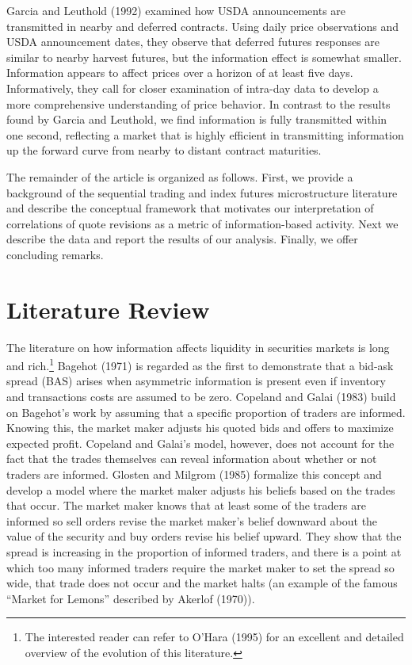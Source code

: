 \documentclass[]{elsarticle} %
\begin{document}
Garcia and Leuthold (1992) examined how USDA announcements are
transmitted in nearby and deferred contracts. Using daily price
observations and USDA announcement dates, they observe that deferred
futures responses are similar to nearby harvest futures, but the
information effect is somewhat smaller. Information appears to affect
prices over a horizon of at least five days. Informatively, they call
for closer examination of intra-day data to develop a more comprehensive
understanding of price behavior. In contrast to the results found by
Garcia and Leuthold, we find information is fully transmitted within one
second, reflecting a market that is highly efficient in transmitting
information up the forward curve from nearby to distant contract
maturities.

The remainder of the article is organized as follows. First, we provide
a background of the sequential trading and index futures microstructure
literature and describe the conceptual framework that motivates our
interpretation of correlations of quote revisions as a metric of
information-based activity. Next we describe the data and report the
results of our analysis. Finally, we offer concluding remarks.

\section{Literature Review}\label{literature-review}

The literature on how information affects liquidity in securities
markets is long and rich.\footnote{The interested reader can refer to
  O'Hara (1995) for an excellent and detailed overview of the evolution
  of this literature.} Bagehot (1971) is regarded as the first to
demonstrate that a bid-ask spread (BAS) arises when asymmetric
information is present even if inventory and transactions costs are
assumed to be zero. Copeland and Galai (1983) build on Bagehot's work by
assuming that a specific proportion of traders are informed. Knowing
this, the market maker adjusts his quoted bids and offers to maximize
expected profit. Copeland and Galai's model, however, does not account
for the fact that the trades themselves can reveal information about
whether or not traders are informed. Glosten and Milgrom (1985)
formalize this concept and develop a model where the market maker
adjusts his beliefs based on the trades that occur. The market maker
knows that at least some of the traders are informed so sell orders
revise the market maker's belief downward about the value of the
security and buy orders revise his belief upward. They show that the
spread is increasing in the proportion of informed traders, and there is
a point at which too many informed traders require the market maker to
set the spread so wide, that trade does not occur and the market halts
(an example of the famous ``Market for Lemons'' described by Akerlof
(1970)).
\end{document}
